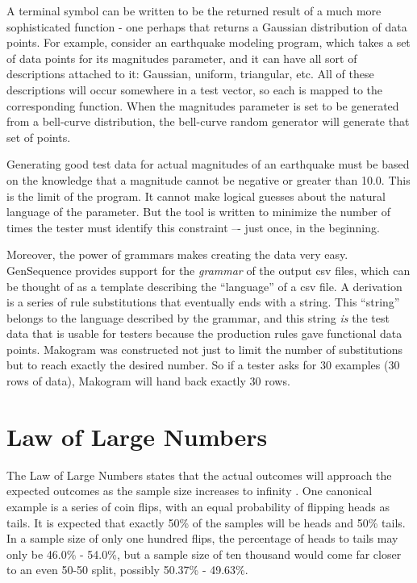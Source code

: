 A terminal symbol can be written to be the returned result of a much more sophisticated function - one perhaps that returns a Gaussian distribution of data points. For example, consider an earthquake modeling program, which takes a set of data points for its magnitudes parameter, and it can have all sort of descriptions attached to it: Gaussian, uniform, triangular, etc. All of these descriptions will occur somewhere in a test vector, so each is mapped to the corresponding function. When the magnitudes parameter is set to be generated from a bell-curve distribution, the bell-curve random generator will generate that set of points.

Generating good test data for actual magnitudes of an earthquake must be based on the knowledge that a magnitude cannot be negative or greater than 10.0. This is the limit of the program. It cannot make logical guesses about the natural language of the parameter. But the tool is written to minimize the number of times the tester must identify this constraint –- just once, in the beginning.

Moreover, the power of grammars makes creating the data very easy. GenSequence provides support for the \textit{grammar} of the output csv files, which can be thought of as a template describing the ``language'' of a csv file. A derivation is a series of rule substitutions that eventually ends with a string. This ``string'' belongs to the language described by the grammar, and this string \textit{is} the test data that is usable for testers because the production rules gave functional data points. Makogram was constructed not just to limit the number of substitutions but to reach exactly the desired number. So if a tester asks for 30 examples (30 rows of data), Makogram will hand back exactly 30 rows.

\section{Law of Large Numbers}
The Law of Large Numbers states that the actual outcomes will approach the expected outcomes as the sample size increases to infinity . One canonical example is a series of coin flips, with an equal probability of flipping heads as tails. It is expected that exactly 50\% of the samples will be heads and 50\% tails. In a sample size of only one hundred flips, the percentage of heads to tails may only be 46.0\% - 54.0\%, but a sample size of ten thousand would come far closer to an even 50-50 split, possibly 50.37\% - 49.63\%. 


